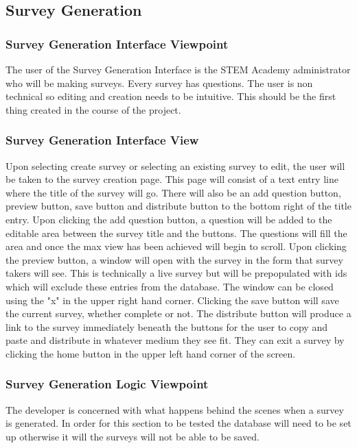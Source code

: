 \documentclass[letterpaper,10pt,serif, draftclsnofoot,onecolumn, compsoc, titlepage]{IEEEtran}
\begin{document}
\subsection{Survey Generation}
\subsubsection{Survey Generation Interface Viewpoint}
The user of the Survey Generation Interface is the STEM Academy administrator who will be making surveys. Every survey has
questions. The user is non technical so editing and creation needs to be intuitive. This should be the first thing created in the course
of the project.  
\subsubsection{Survey Generation Interface View}
Upon selecting create survey or selecting an existing survey to edit, the user will be taken to the survey creation page. 
This page will consist of a text entry line where the title of the survey will go. There will also be an add question button, preview button, save button and distribute button to the bottom right of the title entry. Upon clicking the add question button, a question will be added to the 
editable area between the survey title and the buttons. The questions will fill the area and once the max view has been achieved will begin to scroll. Upon clicking the preview button, a window will open with the survey in the form that survey takers will see. This is 
technically a live survey but will be prepopulated with ids which will exclude these entries from the database. The window can be closed using the "x" in the upper right hand corner. Clicking the save button will save the current survey, whether complete or not.
 The distribute button will produce a link to the survey immediately beneath the buttons for the user to copy and paste and distribute 
in whatever medium they see fit. They can exit a survey by clicking the home button in the upper left hand corner of the screen.  

\subsubsection{Survey Generation Logic Viewpoint}
The developer is concerned with what happens behind the scenes when a survey is generated. In order for this section to be tested
 the database will need to be set up otherwise it will the surveys will not be able to be saved. 
\end{document}
